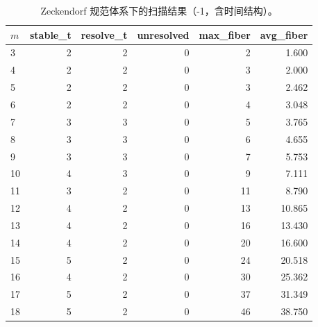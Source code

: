 \begin{table}[H]
\centering
\caption{Zeckendorf 规范体系下的扫描结果（\WL{}-1，含时间结构）。}
\label{tab:zeckendorf_scan_m}
\begin{tabular}{lrrrrr}
\toprule
$m$ & stable\_t & resolve\_t & unresolved & max\_fiber & avg\_fiber\\
\midrule
3 & 2 & 2 & 0 & 2 & 1.600\\
4 & 2 & 2 & 0 & 3 & 2.000\\
5 & 2 & 2 & 0 & 3 & 2.462\\
6 & 2 & 2 & 0 & 4 & 3.048\\
7 & 3 & 3 & 0 & 5 & 3.765\\
8 & 3 & 3 & 0 & 6 & 4.655\\
9 & 3 & 3 & 0 & 7 & 5.753\\
10 & 4 & 3 & 0 & 9 & 7.111\\
11 & 3 & 2 & 0 & 11 & 8.790\\
12 & 4 & 2 & 0 & 13 & 10.865\\
13 & 4 & 2 & 0 & 16 & 13.430\\
14 & 4 & 2 & 0 & 20 & 16.600\\
15 & 5 & 2 & 0 & 24 & 20.518\\
16 & 4 & 2 & 0 & 30 & 25.362\\
17 & 5 & 2 & 0 & 37 & 31.349\\
18 & 5 & 2 & 0 & 46 & 38.750\\
\bottomrule
\end{tabular}
\end{table}
